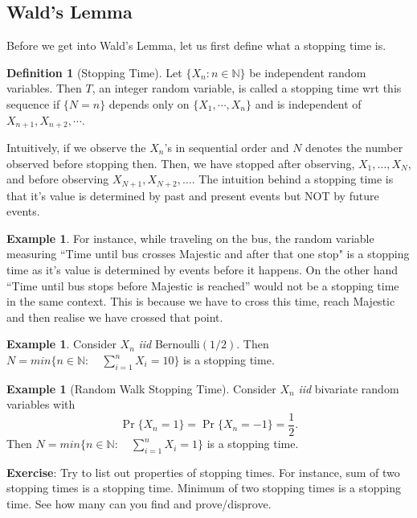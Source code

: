 \documentclass[a4paper,10pt]{article}
\theoremstyle{plain}
\theoremstyle{definition}
\newtheorem{defn}[thm]{Definition}
\newtheorem{exmp}[thm]{Example}
\begin{document}
\subsection{Wald's Lemma}
Before we get into Wald's Lemma, let us first define what a stopping time is.
\begin{defn}[Stopping Time]
Let $\{X_n: n\in \mathbb{N}\}$ be independent random variables. Then $T$, an integer random variable, is called a stopping time wrt this sequence if $\{N=n\}$ depends only on $\{X_1,\cdots,X_n\}$ and is independent of $X_{n+1}, X_{n+2},\cdots$. 
\end{defn}
Intuitively, if we observe the $X_n$'s in sequential order and $N$ denotes the number observed before stopping then. Then, we have stopped after observing, $X_1, \ldots, X_N$, and before observing $X_{N+1}, X_{N+2}, \ldots$. 
The intuition behind a stopping time is that it's value is determined by past and present events but NOT by future events. 
\begin{exmp}
For instance, while traveling on the bus, the random variable measuring ``Time until bus crosses Majestic and after that one stop" is a stopping time as it's value is determined by events before it happens. On the other hand ``Time until bus stops before Majestic is reached'' would not be a stopping time  in the same context. This is because we have to cross this time, reach Majestic and then realise we have crossed that point. 
\end{exmp}
\begin{exmp} Consider $X_n$ \emph{iid} Bernoulli$(1/2)$. Then $N = min \{n \in \mathbb{N}:\quad \sum_{i=1}^n X_i = 10\}$ is a stopping time.
\end{exmp}
\begin{exmp}[Random Walk Stopping Time] Consider $X_n$ \emph{iid} bivariate random variables with 
\begin{equation*}
\Pr\{X_n = 1\} = \Pr\{X_n = -1\} = \frac{1}{2}. 
\end{equation*}
Then $N = min \{n \in \mathbb{N}:\quad \sum_{i=1}^n X_i = 1\}$ is a stopping time.
\end{exmp}

\textbf{Exercise}: Try to list out properties of stopping times. For instance, sum of two stopping times is a stopping time. Minimum of two stopping times is a stopping time. See how many can you find and prove/disprove.
\end{document}
